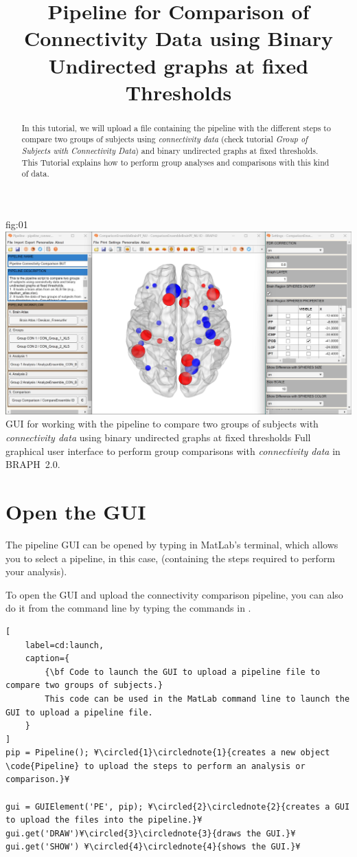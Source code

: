 \documentclass[justified]{tufte-handout}
\title{Pipeline for Comparison of Connectivity Data using Binary Undirected graphs at fixed Thresholds}
\begin{document}
\maketitle

\begin{abstract}
\noindent
In this tutorial, we will upload a file containing the pipeline with the different steps to compare two groups of subjects using \emph{connectivity data} (check tutorial \emph{Group of Subjects with Connectivity Data}) and binary undirected graphs at fixed thresholds. This Tutorial explains how to perform group analyses and comparisons with this kind of data.
\end{abstract}

\tableofcontents

	{fig:01}
	{\includegraphics{fig01.jpg}}
	{GUI for working with the pipeline to compare two groups of subjects with \emph{connectivity data} using binary undirected graphs at fixed thresholds}
	{
	Full graphical user interface to perform group comparisons with \emph{connectivity data} in BRAPH~2.0. 
	}

\clearpage
\section{Open the GUI}

The pipeline GUI can be opened by typing  in MatLab's terminal, which allows you to select a pipeline, in this case,  (containing the steps required to perform your analysis).

To open the GUI and upload the connectivity comparison pipeline, you can also do it from the command line by typing the commands in .
%
\begin{lstlisting}[
	label=cd:launch,
	caption={
		{\bf Code to launch the GUI to upload a pipeline file to compare two groups of subjects.}
		This code can be used in the MatLab command line to launch the GUI to upload a pipeline file.
	}
]
pip = Pipeline(); ¥\circled{1}\circlednote{1}{creates a new object \code{Pipeline} to upload the steps to perform an analysis or comparison.}¥

gui = GUIElement('PE', pip); ¥\circled{2}\circlednote{2}{creates a GUI to upload the files into the pipeline.}¥
gui.get('DRAW')¥\circled{3}\circlednote{3}{draws the GUI.}¥
gui.get('SHOW') ¥\circled{4}\circlednote{4}{shows the GUI.}¥
\end{lstlisting}
\end{document}

